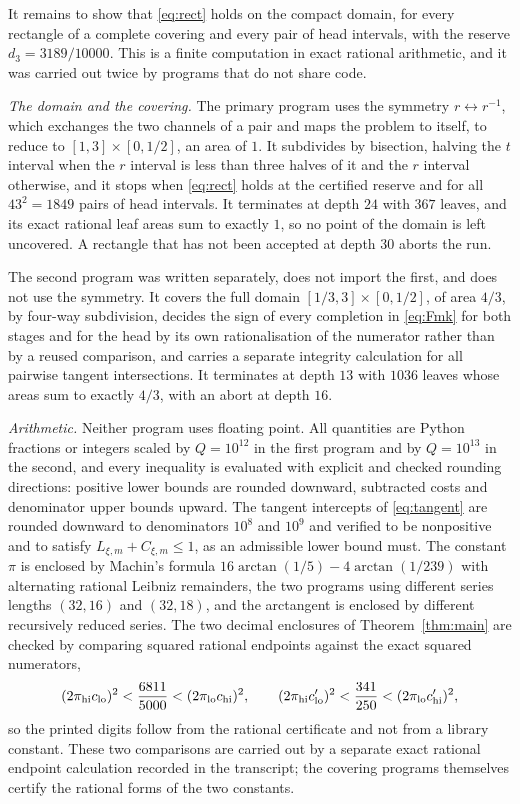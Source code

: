 \documentclass[10pt]{article}
\theoremstyle{remark}
\newcommand{\dthree}{d_{3}}
\begin{document}
It remains to show that \eqref{eq:rect} holds on the compact domain, for every rectangle of a complete covering and every pair of head intervals, with the reserve $\dthree=3189/10000$. This is a finite computation in exact rational arithmetic, and it was carried out twice by programs that do not share code.

\emph{The domain and the covering.} The primary program uses the symmetry $r\leftrightarrow r^{-1}$, which exchanges the two channels of a pair and maps the problem to itself, to reduce to $[1,3]\times[0,1/2]$, an area of $1$. It subdivides by bisection, halving the $t$ interval when the $r$ interval is less than three halves of it and the $r$ interval otherwise, and it stops when \eqref{eq:rect} holds at the certified reserve and for all $43^2=1849$ pairs of head intervals. It terminates at depth $24$ with $367$ leaves, and its exact rational leaf areas sum to exactly $1$, so no point of the domain is left uncovered. A rectangle that has not been accepted at depth $30$ aborts the run.

The second program was written separately, does not import the first, and does not use the symmetry. It covers the full domain $[1/3,3]\times[0,1/2]$, of area $4/3$, by four-way subdivision, decides the sign of every completion in \eqref{eq:Fmk} for both stages and for the head by its own rationalisation of the numerator rather than by a reused comparison, and carries a separate integrity calculation for all pairwise tangent intersections. It terminates at depth $13$ with $1036$ leaves whose areas sum to exactly $4/3$, with an abort at depth $16$.

\emph{Arithmetic.} Neither program uses floating point. All quantities are Python fractions or integers scaled by $Q=10^{12}$ in the first program and by $Q=10^{13}$ in the second, and every inequality is evaluated with explicit and checked rounding directions: positive lower bounds are rounded downward, subtracted costs and denominator upper bounds upward. The tangent intercepts of \eqref{eq:tangent} are rounded downward to denominators $10^8$ and $10^9$ and verified to be nonpositive and to satisfy $L_{\xi,m}+C_{\xi,m}\le1$, as an admissible lower bound must. The constant $\pi$ is enclosed by Machin's formula $16\arctan(1/5)-4\arctan(1/239)$ with alternating rational Leibniz remainders, the two programs using different series lengths $(32,16)$ and $(32,18)$, and the arctangent is enclosed by different recursively reduced series. The two decimal enclosures of Theorem~\ref{thm:main} are checked by comparing squared rational endpoints against the exact squared numerators,
\[
(2\pi_{\rm hi}c_{\rm lo})^2<\frac{6811}{5000}<(2\pi_{\rm lo}c_{\rm hi})^2,\qquad
(2\pi_{\rm hi}c_{\rm lo}')^2<\frac{341}{250}<(2\pi_{\rm lo}c_{\rm hi}')^2,
\]
so the printed digits follow from the rational certificate and not from a library constant. These two comparisons are carried out by a separate exact rational endpoint calculation recorded in the transcript; the covering programs themselves certify the rational forms of the two constants.
\end{document}
